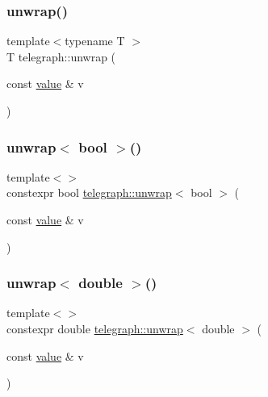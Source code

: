 \mbox{\label{namespacetelegraph_ae06614be6a21deb7e0112a24d559f72c}} 
\subsubsection{\texorpdfstring{unwrap()}{unwrap()}}
{\footnotesize\ttfamily template$<$typename T $>$ \\
T telegraph\+::unwrap (\begin{DoxyParamCaption}\item[{const \hyperlink{classtelegraph_1_1value}{value} \&}]{v }\end{DoxyParamCaption})}

\mbox{\label{namespacetelegraph_adadeb5e799920fdae525572176480217}} 
\subsubsection{\texorpdfstring{unwrap$<$ bool $>$()}{unwrap< bool >()}}
{\footnotesize\ttfamily template$<$$>$ \\
constexpr bool \hyperlink{namespacetelegraph_ae06614be6a21deb7e0112a24d559f72c}{telegraph\+::unwrap}$<$ bool $>$ (\begin{DoxyParamCaption}\item[{const \hyperlink{classtelegraph_1_1value}{value} \&}]{v }\end{DoxyParamCaption})}

\mbox{\label{namespacetelegraph_a714db222bc5b74579bd2d0c5dbd0e6d1}} 
\subsubsection{\texorpdfstring{unwrap$<$ double $>$()}{unwrap< double >()}}
{\footnotesize\ttfamily template$<$$>$ \\
constexpr double \hyperlink{namespacetelegraph_ae06614be6a21deb7e0112a24d559f72c}{telegraph\+::unwrap}$<$ double $>$ (\begin{DoxyParamCaption}\item[{const \hyperlink{classtelegraph_1_1value}{value} \&}]{v }\end{DoxyParamCaption})}

